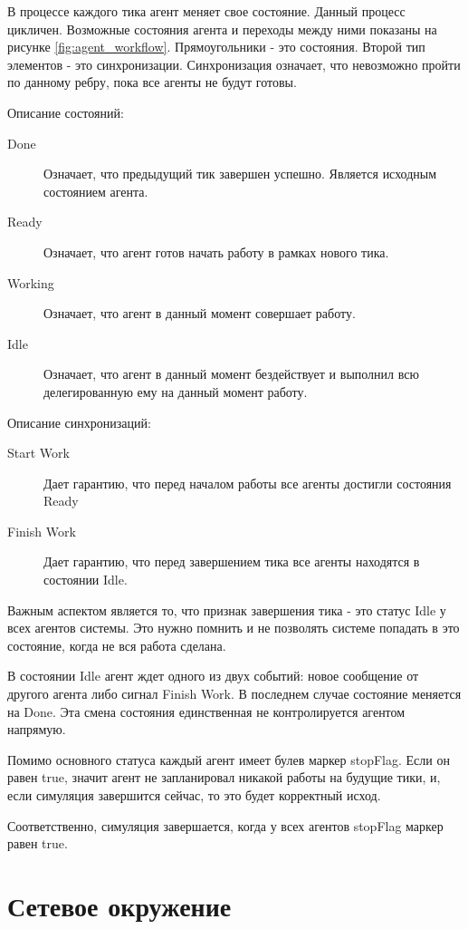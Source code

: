 В процессе каждого тика агент меняет свое состояние. Данный процесс цикличен. Возможные состояния агента и переходы между ними показаны на рисунке \ref{fig:agent_workflow}. Прямоугольники - это состояния. Второй тип элементов - это синхронизации. Синхронизация означает, что невозможно пройти по данному ребру, пока все агенты не будут готовы.

Описание состояний:

\begin{description}
	\item[Done] Означает, что предыдущий тик завершен успешно. Является исходным состоянием агента.
	\item[Ready] Означает, что агент готов начать работу в рамках нового тика.
	\item[Working] Означает, что агент в данный момент совершает работу.
	\item[Idle] Означает, что агент в данный момент бездействует и выполнил всю делегированную ему на данный момент работу.
\end{description}

Описание синхронизаций:

\begin{description}
	\item[Start Work] Дает гарантию, что перед началом работы все агенты достигли состояния Ready
	\item[Finish Work] Дает гарантию, что перед завершением тика все агенты находятся в состоянии Idle.
\end{description}

Важным аспектом является то, что признак завершения тика - это статус Idle у всех агентов системы. Это нужно помнить и не позволять системе попадать в это состояние, когда не вся работа сделана.

В состоянии Idle агент ждет одного из двух событий: новое сообщение от другого агента либо сигнал Finish Work. В последнем случае состояние меняется на Done. Эта смена состояния единственная не контролируется агентом напрямую.

Помимо основного статуса каждый агент имеет булев маркер stopFlag. Если он равен true, значит агент не запланировал никакой работы на будущие тики, и, если симуляция завершится сейчас, то это будет корректный исход.

Соответственно, симуляция завершается, когда у всех агентов stopFlag маркер равен true.

\section{Сетевое окружение}

